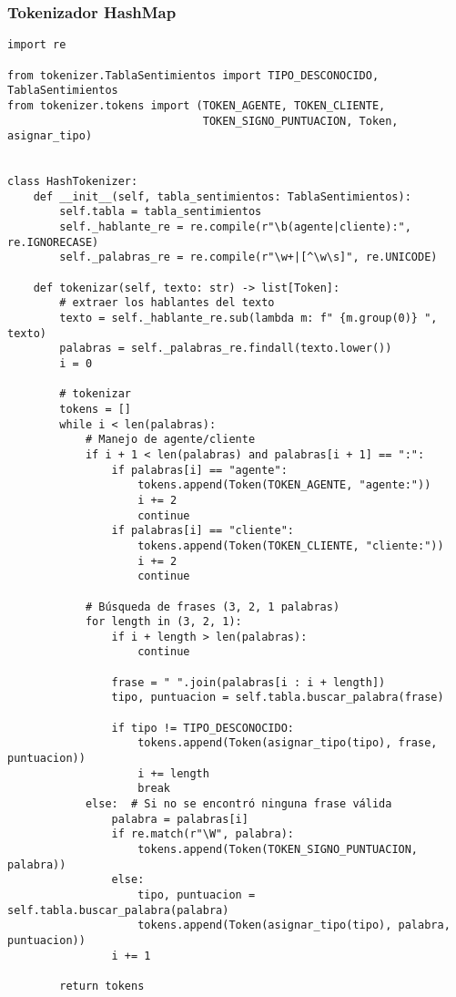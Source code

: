 \subsubsection{Tokenizador HashMap}
\begin{lstlisting}
import re

from tokenizer.TablaSentimientos import TIPO_DESCONOCIDO, TablaSentimientos
from tokenizer.tokens import (TOKEN_AGENTE, TOKEN_CLIENTE,
                              TOKEN_SIGNO_PUNTUACION, Token, asignar_tipo)


class HashTokenizer:
    def __init__(self, tabla_sentimientos: TablaSentimientos):
        self.tabla = tabla_sentimientos
        self._hablante_re = re.compile(r"\b(agente|cliente):", re.IGNORECASE)
        self._palabras_re = re.compile(r"\w+|[^\w\s]", re.UNICODE)

    def tokenizar(self, texto: str) -> list[Token]:
        # extraer los hablantes del texto
        texto = self._hablante_re.sub(lambda m: f" {m.group(0)} ", texto)
        palabras = self._palabras_re.findall(texto.lower())
        i = 0

        # tokenizar
        tokens = []
        while i < len(palabras):
            # Manejo de agente/cliente
            if i + 1 < len(palabras) and palabras[i + 1] == ":":
                if palabras[i] == "agente":
                    tokens.append(Token(TOKEN_AGENTE, "agente:"))
                    i += 2
                    continue
                if palabras[i] == "cliente":
                    tokens.append(Token(TOKEN_CLIENTE, "cliente:"))
                    i += 2
                    continue

            # Búsqueda de frases (3, 2, 1 palabras)
            for length in (3, 2, 1):
                if i + length > len(palabras):
                    continue

                frase = " ".join(palabras[i : i + length])
                tipo, puntuacion = self.tabla.buscar_palabra(frase)

                if tipo != TIPO_DESCONOCIDO:
                    tokens.append(Token(asignar_tipo(tipo), frase, puntuacion))
                    i += length
                    break
            else:  # Si no se encontró ninguna frase válida
                palabra = palabras[i]
                if re.match(r"\W", palabra):
                    tokens.append(Token(TOKEN_SIGNO_PUNTUACION, palabra))
                else:
                    tipo, puntuacion = self.tabla.buscar_palabra(palabra)
                    tokens.append(Token(asignar_tipo(tipo), palabra, puntuacion))
                i += 1

        return tokens
\end{lstlisting}

